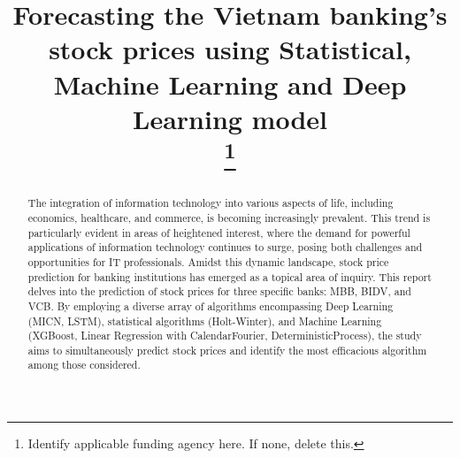 \documentclass[conference]{IEEEtran}
\begin{document}
\title{Forecasting the Vietnam banking’s stock prices using Statistical, Machine Learning and Deep Learning model\\
\thanks{Identify applicable funding agency here. If none, delete this.}
}

\author{
\and
{}
\and
{}
\and
{}
\and
{}
}

\maketitle

\renewcommand{\abstractname}{Abstract}
\begin{abstract}
The integration of information technology into various aspects of life, including economics, healthcare, and commerce, is becoming increasingly prevalent. This trend is particularly evident in areas of heightened interest, where the demand for powerful applications of information technology continues to surge, posing both challenges and opportunities for IT professionals. Amidst this dynamic landscape, stock price prediction for banking institutions has emerged as a topical area of inquiry. This report delves into the prediction of stock prices for three specific banks: MBB, BIDV, and VCB. By employing a diverse array of algorithms encompassing Deep Learning (MICN, LSTM), statistical algorithms (Holt-Winter), and Machine Learning (XGBoost, Linear Regression with CalendarFourier, DeterministicProcess), the study aims to simultaneously predict stock prices and identify the most efficacious algorithm among those considered.
\end{abstract}
\end{document}
